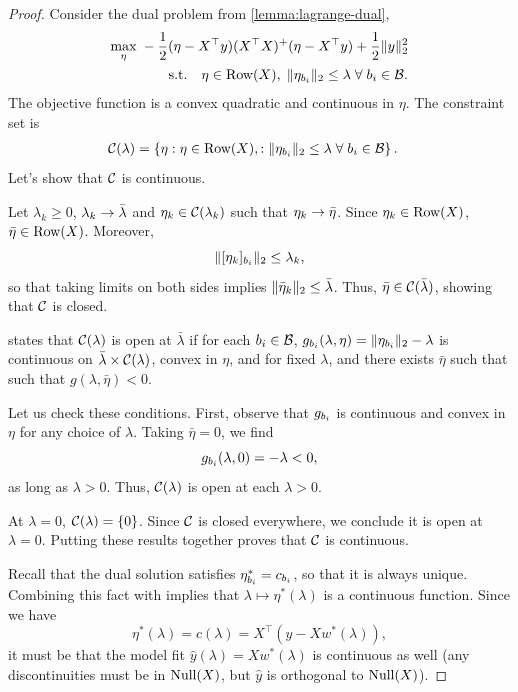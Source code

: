 \modelFitContinuity*
\begin{proof}
	Consider the dual problem from \cref{lemma:lagrange-dual},
	\begin{equation*}
		\begin{aligned}
			\max_{\eta} \;
			 & - \frac 1 2 (\eta - X^\top y) (X^\top X)^+ (\eta - X^\top y) + \frac 1 2 \|y\|_2^2                                  \\
			 & \quad \quad \text{s.t.} \quad \eta \in \text{Row}(X), \; \|\eta_{b_i}\|_2 \leq \lambda \; \forall \; {b_i} \in \mathcal{B}.
		\end{aligned}
	\end{equation*}
	The objective function is a convex quadratic and continuous in \( \eta \).
	The constraint set is
	\begin{align*}
		\mathcal{C}(\lambda)
		 & = \left\{ \eta : \eta \in \text{Row}(X), : \|\eta_{b_i}\|_2 \leq \lambda \; \forall \; {b_i} \in \mathcal{B}\right\}.
	\end{align*}
	Let's show that \( \mathcal{C} \) is continuous.

	Let \( \lambda_k \geq 0 \), \( \lambda_k \rightarrow \bar \lambda \)
	and \( \eta_k \in \mathcal{C}(\lambda_k) \) such that \( \eta_k \rightarrow \bar \eta \).
	Since \( \eta_k \in \text{Row}(X) \), \( \bar \eta \in \text{Row}(X) \).
	Moreover,
	\[
		\|[\eta_k]_{b_i}\|_2 \leq \lambda_k,
	\]
	so that taking
	limits on both sides implies \( \|\bar \eta_k\|_2 \leq \bar \lambda \).
	Thus, \( \bar \eta \in \mathcal{C}(\bar \lambda) \), showing that \( \mathcal{C} \)
	is closed.

	\citet[Theorem 12]{hogan1973point} states that \( \mathcal{C}(\lambda) \)
	is open at \( \bar \lambda \) if for each \( {b_i} \in \mathcal{B} \), \( g_{b_i}(\lambda, \eta) = \|\eta_{b_i}\|_2 - \lambda \)
	is continuous on \( \bar \lambda \times \mathcal{C}(\lambda) \), convex in
	\( \eta \), and for fixed \( \lambda \), and there exists \( \bar \eta \)
	such that such that \( g(\lambda, \bar \eta) < 0  \).

	Let us check these conditions.
	First, observe that \( g_{b_i} \) is continuous and convex in \( \eta \) for
	any choice of \( \lambda \).
	Taking \( \bar \eta = 0 \), we find
	\[
		g_{b_i}(\lambda, 0) = -\lambda < 0,
	\]
	as long as \( \lambda > 0 \).
	Thus, \( \mathcal{C}(\lambda) \) is open at each \( \lambda > 0 \).

	At \( \lambda = 0 \), \( \mathcal{C}(\lambda) = \left\{0\right\} \).
	Since \( \mathcal{C} \) is closed everywhere, we conclude it is open at
	\( \lambda = 0 \).
	Putting these results together proves that \( \mathcal{C} \) is continuous.

	Recall that the dual solution satisfies \( \eta^*_{b_i} = c_{b_i} \),
	so that it is always unique.
	Combining this fact with \citet[Theorem 1]{robinson1974sufficient}
	implies that \( \lambda \mapsto \eta^*(\lambda) \) is a continuous
	function.
	Since we have
	\[
		\eta^*(\lambda) = c(\lambda) = X^\top (y - X w^*(\lambda)),
	\]
	it must be that the model fit \( \hat y(\lambda) = X w^*(\lambda) \)
	is continuous as well (any discontinuities must be in \( \text{Null}(X) \),
	but \( \hat y \) is orthogonal to \( \text{Null}(X) \)).


\end{proof}
